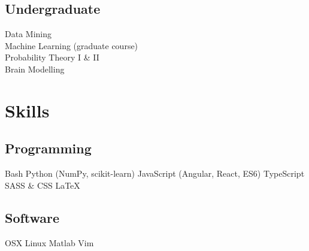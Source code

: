 \documentclass[]{deedy-resume-openfont}
\begin{document}
\begin{minipage}[t]{0.33\textwidth}
\subsection{Undergraduate}
Data Mining \\
Machine Learning (graduate course) \\
Probability Theory I \& II \\
Brain Modelling


\section{Skills}
\subsection{Programming}
Bash \textbullet{} Python (NumPy, scikit-learn) \textbullet{} JavaScript (Angular, React, ES6) \textbullet{} TypeScript \textbullet{} SASS \& CSS \textbullet{} \LaTeX \textbullet{}
\sectionsep

\subsection{Software}
OSX \textbullet{} Linux \textbullet{} Matlab \textbullet{}
Vim

%
%

\end{minipage}
\hfill
\end{document}
